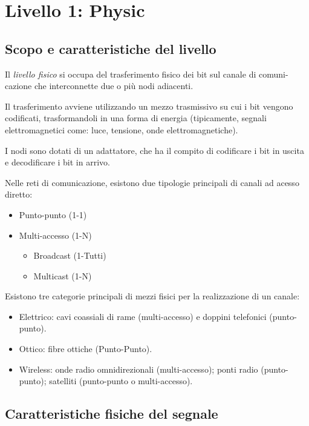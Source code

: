\section{Livello 1: Physic}
    \subsection{Scopo e caratteristiche del livello}
        Il \textit{livello fisico} si occupa del trasferimento fisico dei bit sul canale di comuni- cazione che interconnette due o più nodi adiacenti.

        Il trasferimento avviene utilizzando un mezzo trasmissivo su cui i bit vengono codificati, trasformandoli in una forma di energia (tipicamente, segnali elettromagnetici come: luce, tensione, onde elettromagnetiche).

        I nodi sono dotati di un adattatore, che ha il compito di codificare i bit in uscita e decodificare i bit in arrivo.

        Nelle reti di comunicazione, esistono due tipologie principali di canali ad acesso diretto:
        \begin{itemize}
            \item Punto-punto (1-1)
            \item Multi-accesso (1-N)
            \begin{itemize}
                \item Broadcast (1-Tutti)
                \item Multicast (1-N)
            \end{itemize}
        \end{itemize}

        Esistono tre categorie principali di mezzi fisici per la realizzazione di un canale:
        \begin{itemize}
            \item Elettrico: cavi coassiali di rame (multi-accesso) e doppini telefonici (punto-punto).
            \item Ottico: fibre ottiche (Punto-Punto).
            \item Wireless: onde radio omnidirezionali (multi-accesso); ponti radio (punto-punto); satelliti (punto-punto o multi-accesso).
        \end{itemize}

    \subsection{Caratteristiche fisiche del segnale}

